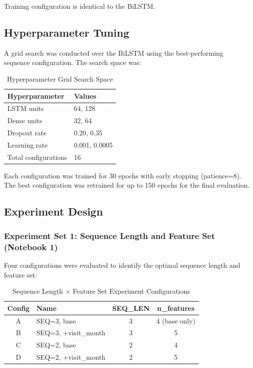 \documentclass[12pt,singleside,a4paper]{article}
\begin{document}
Training configuration is identical to the BiLSTM.

\subsection{Hyperparameter Tuning}

A grid search was conducted over the BiLSTM using the best-performing sequence configuration. The search space was:

\begin{table}[h]
\centering
\caption{Hyperparameter Grid Search Space}
\begin{tabular}{ll}
\toprule
\textbf{Hyperparameter} & \textbf{Values} \\
\midrule
LSTM units & 64, 128 \\
Dense units & 32, 64 \\
Dropout rate & 0.20, 0.35 \\
Learning rate & 0.001, 0.0005 \\
\midrule
Total configurations & 16 \\
\bottomrule
\end{tabular}
\label{tab:hparam_grid}
\end{table}

Each configuration was trained for 30 epochs with early stopping (patience=8). The best configuration was retrained for up to 150 epochs for the final evaluation.

\subsection{Experiment Design}

\subsubsection{Experiment Set 1: Sequence Length and Feature Set (Notebook 1)}
Four configurations were evaluated to identify the optimal sequence length and feature set:

\begin{table}[h]
\centering
\caption{Sequence Length $\times$ Feature Set Experiment Configurations}
\begin{tabular}{clcc}
\toprule
\textbf{Config} & \textbf{Name} & \textbf{SEQ\_LEN} & \textbf{n\_features} \\
\midrule
A & SEQ=3, base & 3 & 4 (base only) \\
B & SEQ=3, +visit\_month & 3 & 5 \\
C & SEQ=2, base & 2 & 4 \\
D & SEQ=2, +visit\_month & 2 & 5 \\
\bottomrule
\end{tabular}
\label{tab:seqlen_experiment}
\end{table}
\end{document}
